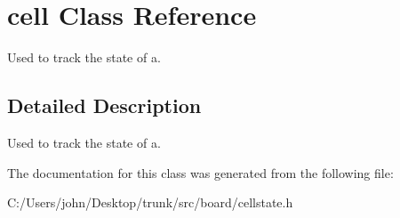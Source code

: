 \hypertarget{classcell}{}\section{cell Class Reference}
\label{classcell}


Used to track the state of a.  




\subsection{Detailed Description}
Used to track the state of a. 

The documentation for this class was generated from the following file\+:\begin{DoxyCompactItemize}
\item 
C\+:/\+Users/john/\+Desktop/trunk/src/board/cellstate.\+h\end{DoxyCompactItemize}

